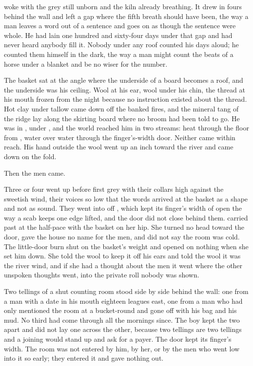 
 woke with the grey still unborn and the kiln already breathing. It drew in fours behind the wall and left a gap where the fifth breath should have been, the way a man leaves a word out of a sentence and goes on as though the sentence were whole. He had lain one hundred and sixty-four days under that gap and had never heard anybody fill it. Nobody under any roof counted his days aloud; he counted them himself in the dark, the way a man might count the beats of a horse under a blanket and be no wiser for the number.

The basket sat at the angle where the underside of a board becomes a roof, and the underside was his ceiling. Wool at his ear, wool under his chin, the thread at his mouth frozen from the night because no instruction existed about the thread. Hot clay under tallow came down off the banked fires, and the mineral tang of the  ridge lay along the skirting board where no broom had been told to go. He was in , under , and the world reached him in two streams: heat through the floor from , water over water through the finger's-width door. Neither came within reach. His hand outside the wool went up an inch toward the river and came down on the fold.

Then the men came.

Three or four went up  before first grey with their collars high against the sweetish wind, their voices so low that the words arrived at the basket as a shape and not as sound. They went into  off , which kept its finger's width of open the way a scab keeps one edge lifted, and the door did not close behind them.  carried past at the half-pace with the basket on her hip. She turned no head toward the door, gave the house no name for the men, and did not say the room was cold. The little-door burn shut on the basket's weight and opened on nothing when she set him down. She told the wool to keep it off his ears and told the wool it was the river wind, and if she had a thought about the men it went where the other unspoken thoughts went, into the private roll nobody was shown.

Two tellings of a shut counting room stood side by side behind the wall: one from a man with a date in his mouth eighteen leagues east, one from a man who had only mentioned the room at a bucket-round and gone off with his bag and his mud. No third had come through all the mornings since. The boy kept the two apart and did not lay one across the other, because two tellings are two tellings and a joining would stand up and ask for a payer. The door kept its finger's width. The room was not entered by him, by her, or by the men who went low into it so early; they entered it and gave nothing out.

